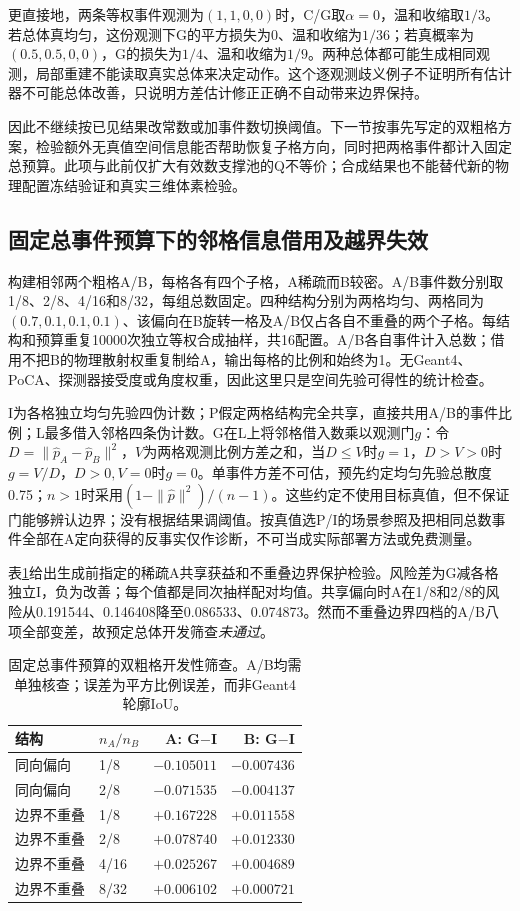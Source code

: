 \documentclass[UTF8,fontset=none,zihao=-4,a4paper]{ctexart}
\begin{document}
更直接地，两条等权事件观测为$(1,1,0,0)$时，C/G取$\alpha=0$，温和收缩取$1/3$。若总体真均匀，这份观测下G的平方损失为0、温和收缩为$1/36$；若真概率为$(0.5,0.5,0,0)$，G的损失为$1/4$、温和收缩为$1/9$。两种总体都可能生成相同观测，局部重建不能读取真实总体来决定动作。这个逐观测歧义例子不证明所有估计器不可能总体改善，只说明方差估计修正正确不自动带来边界保持。

因此不继续按已见结果改常数或加事件数切换阈值。下一节按事先写定的双粗格方案，检验额外无真值空间信息能否帮助恢复子格方向，同时把两格事件都计入固定总预算。此项与此前仅扩大有效数支撑池的Q不等价；合成结果也不能替代新的物理配置冻结验证和真实三维体素检验。

\subsection{固定总事件预算下的邻格信息借用及越界失效}
构建相邻两个粗格A/B，每格各有四个子格，A稀疏而B较密。A/B事件数分别取1/8、2/8、4/16和8/32，每组总数固定。四种结构分别为两格均匀、两格同为$(0.7,0.1,0.1,0.1)$、该偏向在B旋转一格及A/B仅占各自不重叠的两个子格。每结构和预算重复10000次独立等权合成抽样，共16配置。A/B各自事件计入总数；借用不把B的物理散射权重复制给A，输出每格的比例和始终为1。无Geant4、PoCA、探测器接受度或角度权重，因此这里只是空间先验可得性的统计检查。

I为各格独立均匀先验四伪计数；P假定两格结构完全共享，直接共用A/B的事件比例；L最多借入邻格四条伪计数。G在L上将邻格借入数乘以观测门$g$：令$D=\|\hat p_A-\hat p_B\|^2$，$V$为两格观测比例方差之和，当$D\leq V$时$g=1$，$D>V>0$时$g=V/D$，$D>0,V=0$时$g=0$。单事件方差不可估，预先约定均匀先验总散度0.75；$n>1$时采用$(1-\|\hat p\|^2)/(n-1)$。这些约定不使用目标真值，但不保证门能够辨认边界；没有根据结果调阈值。按真值选P/I的场景参照及把相同总数事件全部在A定向获得的反事实仅作诊断，不可当成实际部署方法或免费测量。

表\ref{tab:neighbor-borrowing-risk}给出生成前指定的稀疏A共享获益和不重叠边界保护检验。风险差为G减各格独立I，负为改善；每个值都是同次抽样配对均值。共享偏向时A在1/8和2/8的风险从0.191544、0.146408降至0.086533、0.074873。然而不重叠边界四档的A/B八项全部变差，故预定总体开发筛查\emph{未通过}。

\begin{table}[H]
\centering
\caption{固定总事件预算的双粗格开发性筛查。A/B均需单独核查；误差为平方比例误差，而非Geant4轮廓IoU。}
\label{tab:neighbor-borrowing-risk}
\begin{tabular}{llrr}
\toprule
结构 & $n_A/n_B$ & A: G$-$I & B: G$-$I\\
\midrule
同向偏向 & 1/8 & $-0.105011$ & $-0.007436$\\
同向偏向 & 2/8 & $-0.071535$ & $-0.004137$\\
边界不重叠 & 1/8 & $+0.167228$ & $+0.011558$\\
边界不重叠 & 2/8 & $+0.078740$ & $+0.012330$\\
边界不重叠 & 4/16 & $+0.025267$ & $+0.004689$\\
边界不重叠 & 8/32 & $+0.006102$ & $+0.000721$\\
\bottomrule
\end{tabular}
\end{table}
\end{document}
